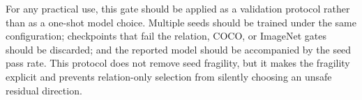 For any practical use, this gate should be applied as a validation protocol rather than as a one-shot model choice. Multiple seeds should be trained under the same configuration; checkpoints that fail the relation, COCO, or ImageNet gates should be discarded; and the reported model should be accompanied by the seed pass rate. This protocol does not remove seed fragility, but it makes the fragility explicit and prevents relation-only selection from silently choosing an unsafe residual direction.
